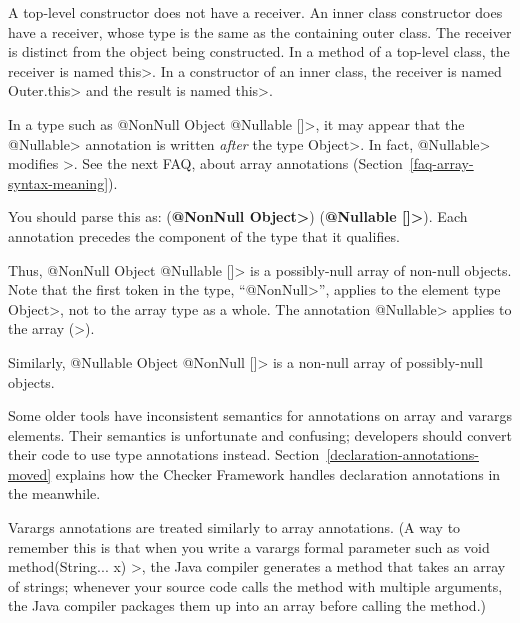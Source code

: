 A top-level constructor does not have a receiver.  An inner class
constructor does have a receiver, whose type is the same as the containing
outer class.  The receiver is distinct from the object being constructed.
In a method of a top-level class, the receiver is named \<this>.  In a
constructor of an inner class, the receiver is named \<Outer.this> and the
result is named \<this>.



In a type such as \<@NonNull Object @Nullable []>, it may appear that the
\<@Nullable> annotation is written \emph{after} the type \<Object>.  In
fact, \<@Nullable> modifies \<[]>.  See the next FAQ, about array
annotations (Section~\ref{faq-array-syntax-meaning}).



You should parse this as:
(\textbf{\<@NonNull Object>}) (\textbf{\<@Nullable []>}).
Each annotation precedes the component of the type that it qualifies.

Thus,
\<@NonNull Object @Nullable []> is a possibly-null array of non-null
objects.  Note that the first token in the type,
``\<@NonNull>'', applies to the element
type \<Object>, not to the array type as a whole.  The annotation \<@Nullable> applies to the
array (\<[]>).

Similarly,
\<@Nullable Object @NonNull []> is a non-null array of possibly-null
objects.

Some older tools have inconsistent semantics for annotations on array and
varargs elements.  Their semantics is unfortunate and confusing; developers
should convert their code to use type annotations instead.
Section~\ref{declaration-annotations-moved} explains how the Checker
Framework handles declaration annotations in the meanwhile.



Varargs annotations are treated similarly to array annotations.
(A way to remember this is that
when you write a varargs formal parameter such as
\<void method(String... x) \ttlcb\ttrcb>, the Java compiler generates a
method that takes an array of strings; whenever your source code calls the
method with multiple arguments, the Java compiler packages them up into an
array before calling the method.)

